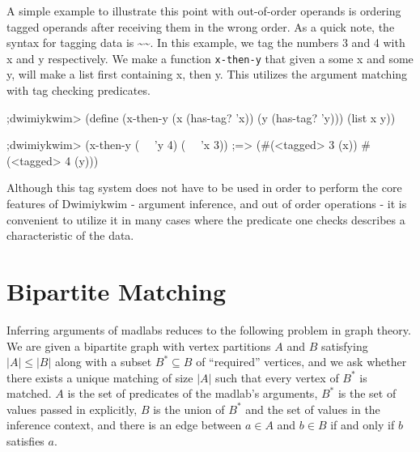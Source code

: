 \documentclass[11pt]{article}
\begin{document}
A simple example to illustrate this point with out-of-order operands
is ordering tagged operands after receiving them in the wrong order.
As a quick note, the syntax for tagging data is \textasciitilde\textasciitilde.
In this example, we tag the numbers 3 and 4 with x and y respectively.
We make a function \texttt{x-then-y} that given a some x and some y,
will make a list first containing x, then y.
This utilizes the argument matching with tag checking predicates.

\begin{verbbox}
;dwimiykwim>
(define (x-then-y (x (has-tag? 'x)) (y (has-tag? 'y)))
  (list x y))

;dwimiykwim>
(x-then-y (~~ 'y 4) (~~ 'x 3))
;=> (#(<tagged> 3 (x)) #(<tagged> 4 (y)))
\end{verbbox}
\begin{quote}\theverbbox\end{quote}

Although this tag system does not have to be used in order to perform
the core features of Dwimiykwim - argument inference,
and out of order operations - it is convenient to utilize it
in many cases where the predicate one checks
describes a characteristic of the data.


\section{Bipartite Matching}\label{bipartite}

Inferring arguments of madlabs
reduces to the following problem in graph theory.
We are given a bipartite graph with vertex partitions $A$ and $B$
satisfying $|A| \leq |B|$
along with a subset $B^* \subseteq B$ of ``required'' vertices,
and we ask whether there exists a unique matching of size $|A|$
such that every vertex of $B^*$ is matched.
$A$ is the set of predicates of the madlab's arguments,
$B^*$ is the set of values passed in explicitly,
$B$ is the union of $B^*$ and the set of values in the inference context,
and there is an edge between $a \in A$ and $b \in B$
if and only if $b$ satisfies $a$.
\end{document}
